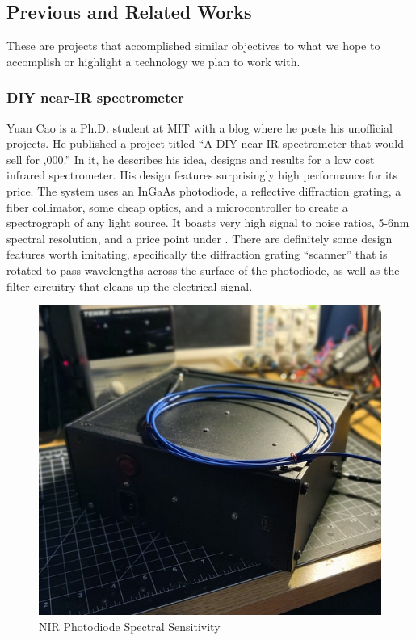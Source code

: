 \subsection{Previous and Related Works}
These are projects that accomplished similar objectives to what we hope to accomplish or highlight a technology we plan to work with.
\subsubsection{DIY near-IR spectrometer}
Yuan Cao is a Ph.D. student at MIT with a blog where he posts his unofficial projects. He published a project titled “A  DIY near-IR spectrometer that would sell for ,000.” In it, he describes his idea, designs and results for a low cost infrared spectrometer. His design features surprisingly high performance for its price. The system uses an InGaAs photodiode, a reflective diffraction grating, a fiber collimator, some cheap optics, and a microcontroller to create a spectrograph of any light source. It boasts very high signal to noise ratios, 5-6nm spectral resolution, and a price point under . There are definitely some design features worth imitating, specifically the diffraction grating “scanner” that is rotated to pass wavelengths across the surface of the photodiode, as well as the filter circuitry that cleans up the electrical signal. 
\begin{figure}[H]
    \caption{NIR Photodiode Spectral Sensitivity}
    \centering
    \includegraphics[width=\textwidth]{images/3.1.1Pic.png}
\end{figure}
